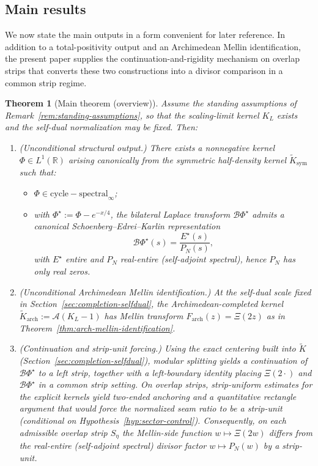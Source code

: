 \documentclass[11pt]{amsart}
\newtheorem{theorem}{Theorem}[section]
\theoremstyle{definition}
\theoremstyle{remark}
\begin{document}
\subsection{Main results}
We now state the main outputs in a form convenient for later reference. In addition to a
total-positivity output and an Archimedean Mellin identification, the present paper supplies the
continuation-and-rigidity mechanism on overlap strips that converts these two constructions into a
divisor comparison in a common strip regime.

\begin{theorem}[Main theorem (overview)]
\label{thm:main}
Assume the standing assumptions of Remark~\ref{rem:standing-assumptions}, so that the scaling-limit
kernel $K_L$ exists and the self-dual normalization may be fixed.
Then:
\begin{enumerate}[label=(\roman*)]
\item (\emph{Unconditional structural output.})
There exists a nonnegative kernel $\Phi\in L^1(\mathbb R)$ arising canonically from the
symmetric half-density kernel $\widetilde K_{\mathrm{sym}}$ such that:
\begin{itemize}
\item $\Phi\in\mathrm{cycle-spectral}_\infty$;
\item with $\Phi^{\star}:=\Phi-e^{-x/4}$, the bilateral Laplace transform $\mathcal B\Phi^{\star}$
admits a canonical Schoenberg--Edrei--Karlin representation
\[
\mathcal B\Phi^{\star}(s)=\frac{E^{\star}(s)}{P_N(s)},
\]
with $E^{\star}$ entire and $P_N$ real-entire (self-adjoint spectral), hence $P_N$ has only real zeros.
\end{itemize}

\item (\emph{Unconditional Archimedean Mellin identification.})
At the self-dual scale fixed in Section~\ref{sec:completion-selfdual}, the Archimedean-completed
kernel $\widetilde K_{\mathrm{arch}}:=\mathcal A(K_L-1)$ has Mellin transform
$F_{\mathrm{arch}}(z)=\Xi(2z)$ as in Theorem~\ref{thm:arch-mellin-identification}.

\item (\emph{Continuation and strip-unit forcing.})
Using the exact centering built into $\widetilde K$ (Section~\ref{sec:completion-selfdual}),
modular splitting yields a continuation of $\mathcal B\Phi^{\star}$ to a left strip, together with a
left-boundary identity placing $\Xi(2\cdot)$ and $\mathcal B\Phi^{\star}$ in a common strip setting.
On overlap strips, strip-uniform estimates for the explicit kernels yield two-ended anchoring and a
quantitative rectangle argument that would force the normalized seam ratio to be a strip-unit (conditional on Hypothesis~\ref{hyp:sector-control}). Consequently,
on each admissible overlap strip $S_\eta$ the Mellin-side function $w\mapsto\Xi(2w)$ differs from the
real-entire (self-adjoint spectral) divisor factor $w\mapsto P_N(w)$ by a strip-unit.
\end{enumerate}
\end{theorem}
\end{document}
